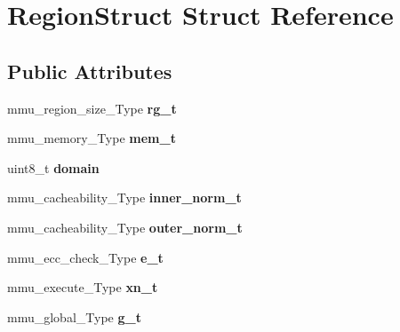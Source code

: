 \hypertarget{structRegionStruct}{}\section{Region\+Struct Struct Reference}
\label{structRegionStruct}
\subsection*{Public Attributes}
\begin{DoxyCompactItemize}
\item 
mmu\+\_\+region\+\_\+size\+\_\+\+Type {\bfseries rg\+\_\+t}\hypertarget{structRegionStruct_af459d58d720e3c319b3ef5e877d27a2d}{}\label{structRegionStruct_af459d58d720e3c319b3ef5e877d27a2d}

\item 
mmu\+\_\+memory\+\_\+\+Type {\bfseries mem\+\_\+t}\hypertarget{structRegionStruct_a96eea15f88c7c48f2804d9dd62f13dc1}{}\label{structRegionStruct_a96eea15f88c7c48f2804d9dd62f13dc1}

\item 
uint8\+\_\+t {\bfseries domain}\hypertarget{structRegionStruct_abdfcd371daa9bf33f88a25f3b8cdeec0}{}\label{structRegionStruct_abdfcd371daa9bf33f88a25f3b8cdeec0}

\item 
mmu\+\_\+cacheability\+\_\+\+Type {\bfseries inner\+\_\+norm\+\_\+t}\hypertarget{structRegionStruct_abb79a425b194f3b7019b828124f74d3e}{}\label{structRegionStruct_abb79a425b194f3b7019b828124f74d3e}

\item 
mmu\+\_\+cacheability\+\_\+\+Type {\bfseries outer\+\_\+norm\+\_\+t}\hypertarget{structRegionStruct_a5f2d9c482e1a5e5ae18ce1e34b940be2}{}\label{structRegionStruct_a5f2d9c482e1a5e5ae18ce1e34b940be2}

\item 
mmu\+\_\+ecc\+\_\+check\+\_\+\+Type {\bfseries e\+\_\+t}\hypertarget{structRegionStruct_a490a04e6b4a2be661137dccc77f7ab3c}{}\label{structRegionStruct_a490a04e6b4a2be661137dccc77f7ab3c}

\item 
mmu\+\_\+execute\+\_\+\+Type {\bfseries xn\+\_\+t}\hypertarget{structRegionStruct_a3d361ef2b9edc3c7a3aa672a284555f3}{}\label{structRegionStruct_a3d361ef2b9edc3c7a3aa672a284555f3}

\item 
mmu\+\_\+global\+\_\+\+Type {\bfseries g\+\_\+t}\hypertarget{structRegionStruct_aaab551b9b577914a2dd63381aa8574f6}{}\label{structRegionStruct_aaab551b9b577914a2dd63381aa8574f6}


\end{DoxyCompactItemize}
